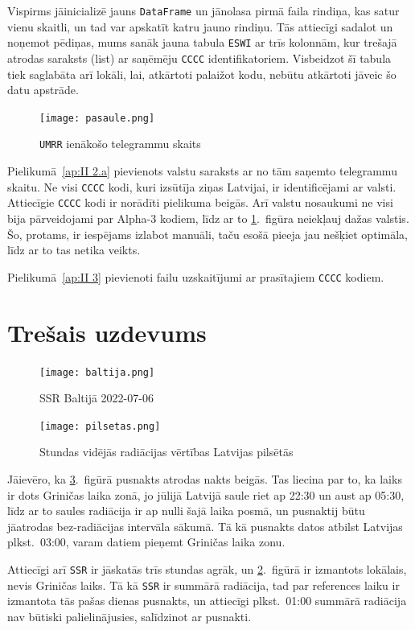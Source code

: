 \documentclass[12pt,a4paper]{article}
\begin{document}
Vispirms jāinicializē jauns \texttt{DataFrame} un jānolasa pirmā faila rindiņa, kas satur vienu skaitli, un tad var apskatīt katru jauno rindiņu.
Tās attiecīgi sadalot un noņemot pēdiņas, mums sanāk jauna tabula \texttt{ESWI} ar trīs kolonnām, kur trešajā atrodas saraksts (list) ar saņēmēju \texttt{CCCC} identifikatoriem.
Visbeidzot šī tabula tiek saglabāta arī lokāli, lai, atkārtoti palaižot kodu, nebūtu atkārtoti jāveic šo datu apstrāde.

\begin{figure}[ht!]
    \centering
    \texttt{[image: pasaule.png]}
    \caption{\texttt{UMRR} ienākošo telegrammu skaits}\label{pasaule}
\end{figure}

Pielikumā~\ref{ap:II 2.a} pievienots valstu saraksts ar no tām saņemto telegrammu skaitu.
Ne visi \texttt{CCCC} kodi, kuri izsūtīja ziņas Latvijai, ir identificējami ar valsti. Attiecīgie \texttt{CCCC} kodi 
ir norādīti pielikuma beigās. Arī valstu nosaukumi ne visi bija pārveidojami par Alpha-3 kodiem, līdz ar to \ref{pasaule}.~figūra neiekļauj dažas valstis. Šo, protams, ir iespējams izlabot manuāli, taču esošā pieeja jau nešķiet optimāla, līdz ar to tas netika veikts.

Pielikumā~\ref{ap:II 3} pievienoti failu uzskaitījumi ar prasītajiem \texttt{CCCC} kodiem.

\section*{Trešais uzdevums}




\begin{figure}[ht!]
    \centering
    \texttt{[image: baltija.png]}
    \caption{SSR Baltijā 2022-07-06}\label{baltija}
\end{figure}
\begin{figure}[ht!]
    \centering
    \texttt{[image: pilsetas.png]}
    \caption{Stundas vidējās radiācijas vērtības Latvijas pilsētās}\label{pilsetas}
\end{figure}
Jāievēro, ka \ref{pilsetas}.~figūrā pusnakts atrodas nakts beigās. Tas liecina par to, ka laiks ir dots Griničas laika zonā, jo jūlijā Latvijā saule riet ap 22:30 un aust ap 05:30, līdz ar to saules radiācija ir ap nulli šajā laika posmā,
un pusnaktij būtu jāatrodas bez-radiācijas intervāla sākumā. Tā kā pusnakts datos atbilst Latvijas plkst.~03:00, varam datiem pieņemt Griničas laika zonu.


Attiecīgi arī \texttt{SSR} ir jāskatās trīs stundas agrāk, un \ref{baltija}.~figūrā ir izmantots lokālais, nevis Griničas laiks. Tā kā \texttt{SSR} ir summārā radiācija, tad par references laiku ir izmantota tās pašas dienas pusnakts, un attiecīgi plkst.~01:00 summārā radiācija nav būtiski palielinājusies, salīdzinot ar pusnakti.
\end{document}
